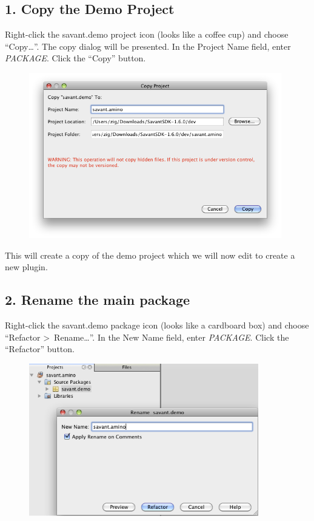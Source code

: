 \documentclass[times,11pt]{report}
\begin{document}
\subsection*{1. Copy the Demo Project}
Right-click the savant.demo project icon (looks like a coffee cup) and choose ``Copy\ldots''. The copy dialog will be presented. In the Project Name field, enter \textit{PACKAGE}. Click the ``Copy'' button.
\begin{figure}[h!]
\begin{center}
\includegraphics[type=png,ext=.png,read=.png,width=11cm]{images/CopyProject}
\end{center}
\end{figure}

This will create a copy of the demo project which we will now edit to create a new plugin.
\subsection*{2. Rename the main package}
Right-click the savant.demo package icon (looks like a cardboard box) and choose ``Refactor \textgreater~Rename\ldots''. In the New Name field, enter \textit{PACKAGE}. Click the ``Refactor'' button.
\begin{figure}[h!]
\begin{center}
\includegraphics[type=png,ext=.png,read=.png,width=10cm]{images/RenamePackage}
\end{center}
\end{figure}
\end{document}

